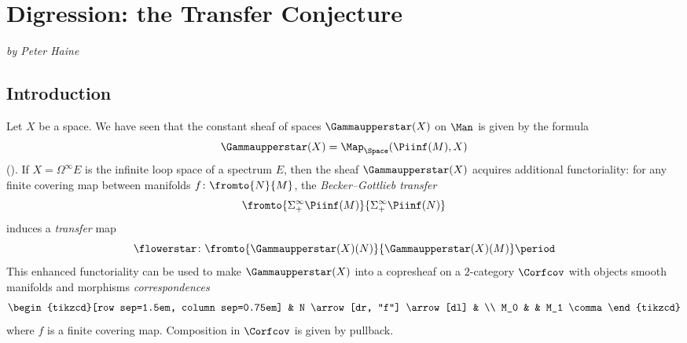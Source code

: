 
\section{Digression: the Transfer Conjecture}\label{sec:digressiononTransferConjecture}
\textit{by Peter Haine}


\subsection{Introduction}

Let $ X $ be a space.
We have seen that the constant sheaf of spaces $ \Gammaupperstar(X) $ on $ \Man $ is given by the formula
\begin{equation*}
	 \Gammaupperstar(X) = \Map_{\Space}(\Piinf(M),X)
\end{equation*}
().
If $ X = \Omega^{\infty} E $ is the infinite loop space of a spectrum $ E $, then the sheaf $ \Gammaupperstar(X) $ acquires additional functoriality: for any finite covering map between manifolds $ f \colon \fromto{N}{M} $, the \textit{Becker--Gottlieb transfer}
\begin{equation*}
	\fromto{\Sigma_{+}^{\infty} \Piinf(M)}{\Sigma_{+}^{\infty} \Piinf(N)}
\end{equation*}
\cite[Definition 3.11]{Haugseng:Becker-Gottlieb} induces a \textit{transfer} map
\begin{equation*}
	\flowerstar \colon \fromto{\Gammaupperstar(X)(N)}{\Gammaupperstar(X)(M)} \period
\end{equation*} 
This enhanced functoriality can be used to make $ \Gammaupperstar(X) $ into a copresheaf on a $ 2 $-category $ \Corfcov $ with objects smooth manifolds and morphisms \textit{correspondences}
\begin{equation*}
	\begin{tikzcd}[row sep=1.5em, column sep=0.75em]
		& N \arrow[dr, "f"] \arrow[dl] & \\
		M_0 & & M_1 \comma
	\end{tikzcd}
\end{equation*}
where $ f $ is a finite covering map.
Composition in $ \Corfcov $ is given by pullback. 

